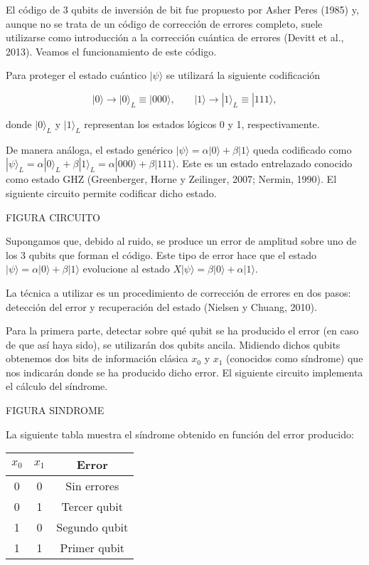 El código de 3 qubits de inversión de bit fue propuesto por Asher Peres (1985) y, aunque no se trata de un código de corrección de errores completo, suele utilizarse como introducción a la corrección cuántica de errores (Devitt et al., 2013). Veamos el funcionamiento de este código.

Para proteger el estado cuántico $ | \psi \rangle $ se utilizará la siguiente codificación

$$ | 0 \rangle \rightarrow | 0 \rangle_L \equiv | 000 \rangle,  \phantom{abcd}   | 1 \rangle \rightarrow | 1 \rangle_L \equiv | 111 \rangle, $$

donde $ |0 \rangle_L$ y $| 1 \rangle_L $ representan los estados lógicos 0 y 1, respectivamente.

De manera análoga, el estado genérico $| \psi \rangle = \alpha |0 \rangle + \beta | 1 \rangle $ queda codificado como $|\psi \rangle_L = \alpha | 0 \rangle_L + \beta | 1 \rangle_L = \alpha | 000 \rangle + \beta | 111 \rangle $. Este es un estado entrelazado conocido como estado GHZ (Greenberger, Horne y Zeilinger, 2007; Nermin, 1990). El siguiente circuito permite codificar dicho estado.

FIGURA CIRCUITO

Supongamos que, debido al ruido, se produce un error de amplitud sobre uno de los 3 qubits que forman el código. Este tipo de error hace que el estado $ | \psi \rangle = \alpha | 0 \rangle + \beta | 1 \rangle$ evolucione al estado $X | \psi \rangle = \beta | 0 \rangle + \alpha | 1 \rangle $.

La técnica a utilizar es un procedimiento de corrección de errores en dos pasos: detección del error y recuperación del estado (Nielsen y Chuang, 2010). 

Para la primera parte, detectar sobre qué qubit se ha producido el error (en caso de que así haya sido), se utilizarán dos qubits ancila. Midiendo dichos qubits obtenemos dos bits de información clásica $x_0$ y $x_1$ (conocidos como síndrome) que nos indicarán donde se ha producido dicho error. El siguiente circuito implementa el cálculo del síndrome.

FIGURA SINDROME

La siguiente tabla muestra el síndrome obtenido en función del error producido: \\


\begin{tabular}{|c|c|c|}
  \hline
  $x_0$ & $x_1$ & Error \\
  \hline
  0 & 0 & Sin errores \\
  \hline
  0 & 1 & Tercer qubit \\
  \hline
  1 & 0 & Segundo qubit \\
  \hline
  1 & 1 & Primer qubit \\
  \hline
\end{tabular}
\\

